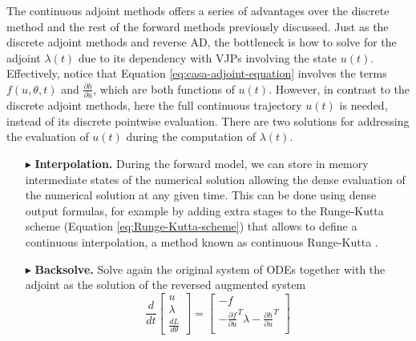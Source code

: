The continuous adjoint methods offers a series of advantages over the discrete method and the rest of the forward methods previously discussed. 
Just as the discrete adjoint methods and reverse AD, the bottleneck is how to solve for the adjoint $\lambda(t)$ due to its dependency with VJPs involving the state $u(t)$.
Effectively, notice that Equation \eqref{eq:casa-adjoint-equation} involves the terms $f(u, \theta, t)$ and $\frac{\partial h}{\partial u}$, which are both functions of $u(t)$. 
However, in contrast to the discrete adjoint methods, here the full continuous trajectory $u(t)$ is needed, instead of its discrete pointwise evaluation. 
There are two solutions for addressing the evaluation of $u(t)$ during the computation of $\lambda (t)$.
\begin{enumerate}
    \item[$ \blacktriangleright$] \textbf{Interpolation.} During the forward model, we can store in memory intermediate states of the numerical solution allowing the dense evaluation of the numerical solution at any given time. 
    This can be done using dense output formulas, for example by adding extra stages to the Runge-Kutta scheme (Equation \eqref{eq:Runge-Kutta-scheme}) that allows to define a continuous interpolation, a method known as continuous Runge-Kutta \cite{hairer-solving-2, Alexe_Sandu_2009}. 
    \item[$ \blacktriangleright$] \textbf{Backsolve.} Solve again the original system of ODEs together with the adjoint as the solution of the reversed augmented system \cite{chen_neural_2019}
    \begin{equation}
    \frac{d}{dt}
    \begin{bmatrix}
       u \\
       \lambda \\
       \frac{dL}{d\theta}
    \end{bmatrix}
    = 
    \begin{bmatrix}
       -f \\
       - \frac{\partial f}{\partial u}^T \lambda - \frac{\partial h}{\partial u}^T \\

\end{bmatrix}
\end{equation}
\end{enumerate}
